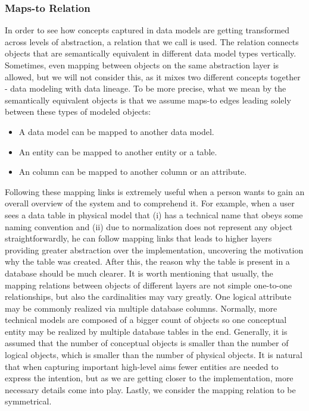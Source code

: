 \subsubsection{Maps-to Relation}

In order to see how concepts captured in data models are getting transformed across levels of abstraction, a relation that we call  is used. The relation connects objects that are semantically equivalent in different data model types vertically.
Sometimes, even mapping between objects on the same abstraction layer is allowed, but we will not consider this, as it mixes two different concepts together - data modeling with data lineage. To be more precise, what we mean by the semantically equivalent objects is that we assume maps-to edges leading solely between these types of modeled objects: 
\begin{itemize}
	\item A data model can be mapped to another data model.
	\item An entity can be mapped to another entity or a table.
	\item An column can be mapped to another column or an attribute.
\end{itemize}
Following these mapping links is extremely useful when a person wants to gain an overall overview of the system and to comprehend it. For example, when a user sees a data table in physical model that (i) has a technical name that obeys some naming convention and (ii) due to normalization does not represent any object straightforwardly, he can follow mapping links that leads to higher layers providing greater abstraction over the implementation, uncovering the motivation why the table was created. After this, the reason why the table is present in a database should be much clearer.
It is worth mentioning that usually, the mapping relations between objects of different layers are not simple one-to-one relationships, but also the cardinalities may vary greatly. One logical attribute may be commonly realized via multiple database columns.
Normally, more technical models are composed of a bigger count of objects so one conceptual entity may be realized by multiple database tables in the end. Generally, it is assumed that the number of conceptual objects is smaller than the number of logical objects, which is smaller than the number of physical objects. It is natural that when capturing important high-level aims fewer entities are needed to express the intention, but as we are getting closer to the implementation, more necessary details come into play.
Lastly, we consider the mapping relation to be symmetrical.

